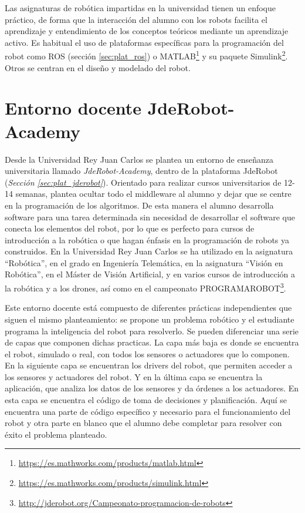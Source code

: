Las asignaturas de robótica impartidas en la universidad tienen un enfoque práctico, de forma que la interacción del alumno con los robots facilita el aprendizaje y entendimiento de los conceptos teóricos mediante un aprendizaje activo. Es habitual el uso de plataformas específicas para la programación del robot como ROS (sección \ref{sec:plat_ros}) o MATLAB\footnote{\url{https://es.mathworks.com/products/matlab.html}} y su paquete Simulink\footnote{\url{https://es.mathworks.com/products/simulink.html}}. Otros se centran en el diseño y modelado del robot.

\section{Entorno docente JdeRobot-Academy }
\label{sec:intr_entornodocente}

Desde la Universidad Rey Juan Carlos se plantea un entorno de enseñanza universitaria llamado \textit{JdeRobot-Academy}, dentro de la plataforma JdeRobot (\textit{Sección \ref{sec:plat_jderobot}}). Orientado para realizar cursos universitarios de 12-14 semanas, plantea ocultar todo el middleware al alumno y dejar que se centre en la programación de los algoritmos. De esta manera el alumno desarrolla software para una tarea determinada sin necesidad de desarrollar el software que conecta los elementos del robot, por lo que es perfecto para cursos de introducción a la robótica o que hagan énfasis en la programación de robots ya construidos. En la Universidad Rey Juan Carlos se ha utilizado en la asignatura \textquotedblleft Robótica\textquotedblright, en el grado en Ingeniería Telemática, en la asignatura \textquotedblleft Visión en Robótica\textquotedblright, en el Máster de Visión Artificial, y en varios cursos de introducción a la robótica y a los drones, así como en el campeonato PROGRAMAROBOT\footnote{\url{http://jderobot.org/Campeonato-programacion-de-robots}}.

Este entorno docente está compuesto de diferentes prácticas independientes que siguen el mismo planteamiento: se propone un problema robótico y el estudiante programa la inteligencia del robot para resolverlo. Se pueden diferenciar una serie de capas que componen dichas practicas. La capa más baja es donde se encuentra el robot, simulado o real, con todos los sensores o actuadores que lo componen. En la siguiente capa se encuentran los drivers del robot, que permiten acceder a los sensores y actuadores del robot. Y en la última capa se encuentra la aplicación, que analiza los datos de los sensores y da órdenes a los actuadores. En esta capa se encuentra el código de toma de decisiones y planificación. Aquí se encuentra una parte de código específico y necesario para el funcionamiento del robot y otra parte en blanco que el alumno debe completar para resolver con éxito el problema planteado. 

